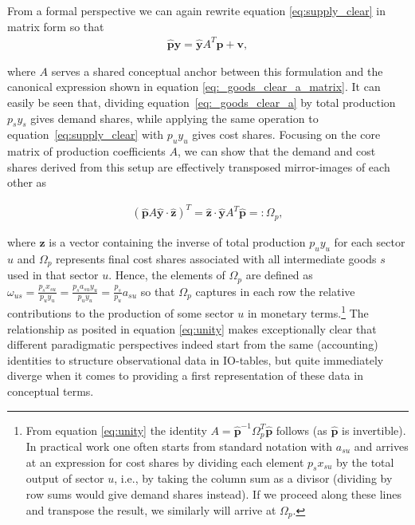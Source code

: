 \documentclass{article}
\newcommand{\hbf}[1]{\hat {\mathbf #1}}
\begin{document}
From a formal perspective we can again rewrite equation \eqref{eq:supply_clear} in matrix form so that
\begin{align}
     \hat {\mathbf p} \mathbf y = \hat {\mathbf y} A^T \mathbf p + \mathbf v,
\end{align}

where $A$ serves a shared conceptual anchor between this formulation and the canonical expression shown in equation \eqref{eq:_goods_clear_a_matrix}. It can easily be seen that, dividing equation~\eqref{eq:_goods_clear_a} by total production $p_s y_s$ gives demand shares, while applying the same operation to equation~\eqref{eq:supply_clear} with $p_u y_u$ gives cost shares. 
Focusing on the core matrix of production coefficients $A$, we can show that the demand and cost shares derived from this setup are effectively transposed mirror-images of each other as

\begin{align}
    \label{eq:unity}
    (\hat {\mathbf p} A \hbf{y} \cdot \hat {\mathbf z})^T = \hat {\mathbf z} \cdot  \hat {\mathbf y} A^T \hbf{p} =: \Omega_{p},
\end{align}

where ${\mathbf z}$ is a vector containing the inverse of total production $p_u y_u$ for each sector $u$ and $\Omega_p$ represents final cost shares associated with all intermediate goods $s$ used in that sector $u$.
Hence, the elements of $\Omega_p$ are defined as $\omega_{us}=\frac{p_sx_{su}}{p_uy_u}=\frac{p_sa_{su}y_u}{p_uy_u}=\frac{p_s}{p_u}a_{su}$ so that $\Omega_p$ captures in each row the relative contributions to the production of some sector $u$ in monetary terms.\footnote{From equation \eqref{eq:unity} the identity $A = \hbf{p}^{-1} \Omega_p^T \hbf{p}$ follows (as $\hbf {p}$ is invertible). In practical work one often starts from standard notation with $a_{su}$ and arrives at an expression for cost shares by dividing each element $p_sx_{su}$ by the total output of sector $u$, i.e., by taking the column sum as a divisor (dividing by row sums would give demand shares instead). 
If we proceed along these lines and transpose the result, we similarly will arrive at $\Omega_p$.}
The relationship as posited in equation \eqref{eq:unity} makes exceptionally clear that different paradigmatic perspectives indeed start from the same (accounting) identities to structure observational data in IO-tables, but quite immediately diverge when it comes to providing a first representation of these data in conceptual terms.
\end{document}
